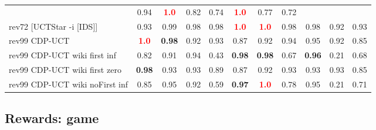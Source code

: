 \documentclass{article}
\begin{document}
\begin{tabular}{|l|r@{$\pm$}rr@{$\pm$}rr@{$\pm$}rr@{$\pm$}rr@{$\pm$}rr@{$\pm$}rr@{$\pm$}rr@{$\pm$}rr@{$\pm$}rr@{$\pm$}r|}
& \multicolumn{2}{c}{0.94}
& \multicolumn{2}{c}{\textbf{\textcolor{red}{1.0}}}
& \multicolumn{2}{c}{0.82}
& \multicolumn{2}{c}{0.74}
& \multicolumn{2}{c}{\textbf{\textcolor{red}{1.0}}}
& \multicolumn{2}{c}{0.77}
& \multicolumn{2}{c|}{0.72}
\\
rev72 [UCTStar -i [IDS]]
& \multicolumn{2}{c}{0.93}
& \multicolumn{2}{c}{0.99}
& \multicolumn{2}{c}{0.98}
& \multicolumn{2}{c}{0.98}
& \multicolumn{2}{c}{\textbf{\textcolor{red}{1.0}}}
& \multicolumn{2}{c}{\textbf{\textcolor{red}{1.0}}}
& \multicolumn{2}{c}{0.98}
& \multicolumn{2}{c}{0.98}
& \multicolumn{2}{c}{0.92}
& \multicolumn{2}{c|}{0.93}
\\
\hline
rev99 CDP-UCT
& \multicolumn{2}{c}{\textbf{\textcolor{red}{1.0}}}
& \multicolumn{2}{c}{\textbf{0.98}}
& \multicolumn{2}{c}{0.92}
& \multicolumn{2}{c}{0.93}
& \multicolumn{2}{c}{0.87}
& \multicolumn{2}{c}{0.92}
& \multicolumn{2}{c}{0.94}
& \multicolumn{2}{c}{0.95}
& \multicolumn{2}{c}{0.92}
& \multicolumn{2}{c|}{0.85}
\\
rev99 CDP-UCT wiki first inf
& \multicolumn{2}{c}{0.82}
& \multicolumn{2}{c}{0.91}
& \multicolumn{2}{c}{0.94}
& \multicolumn{2}{c}{0.43}
& \multicolumn{2}{c}{\textbf{0.98}}
& \multicolumn{2}{c}{\textbf{0.98}}
& \multicolumn{2}{c}{0.67}
& \multicolumn{2}{c}{\textbf{0.96}}
& \multicolumn{2}{c}{0.21}
& \multicolumn{2}{c|}{0.68}
\\
rev99 CDP-UCT wiki first zero
& \multicolumn{2}{c}{\textbf{0.98}}
& \multicolumn{2}{c}{0.93}
& \multicolumn{2}{c}{0.93}
& \multicolumn{2}{c}{0.89}
& \multicolumn{2}{c}{0.87}
& \multicolumn{2}{c}{0.92}
& \multicolumn{2}{c}{0.93}
& \multicolumn{2}{c}{0.93}
& \multicolumn{2}{c}{0.93}
& \multicolumn{2}{c|}{0.85}
\\
rev99 CDP-UCT wiki noFirst inf
& \multicolumn{2}{c}{0.85}
& \multicolumn{2}{c}{0.95}
& \multicolumn{2}{c}{0.92}
& \multicolumn{2}{c}{0.59}
& \multicolumn{2}{c}{\textbf{0.97}}
& \multicolumn{2}{c}{\textbf{\textcolor{red}{1.0}}}
& \multicolumn{2}{c}{0.78}
& \multicolumn{2}{c}{0.95}
& \multicolumn{2}{c}{0.21}
& \multicolumn{2}{c|}{0.71}
\\
\hline
\end{tabular}%

\bigskip

\subsection*{Rewards: game}
\end{document}
